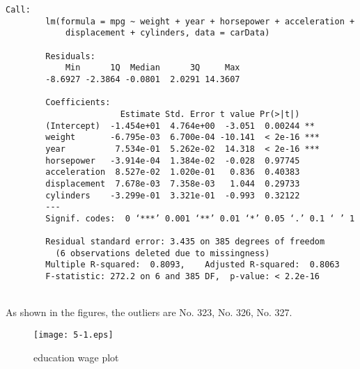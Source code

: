 \documentclass[12pt]{article}
\begin{document}
	\lstset{language=R}
	\lstset{frame=lines}
	\lstset{basicstyle=\footnotesize\ttfamily}
	\begin{lstlisting}[breaklines=true]
		Call:
		lm(formula = mpg ~ weight + year + horsepower + acceleration + 
		    displacement + cylinders, data = carData)
		
		Residuals:
		    Min      1Q  Median      3Q     Max 
		-8.6927 -2.3864 -0.0801  2.0291 14.3607 
		
		Coefficients:
					   Estimate Std. Error t value Pr(>|t|)    
		(Intercept)  -1.454e+01  4.764e+00  -3.051  0.00244 ** 
		weight       -6.795e-03  6.700e-04 -10.141  < 2e-16 ***
		year          7.534e-01  5.262e-02  14.318  < 2e-16 ***
		horsepower   -3.914e-04  1.384e-02  -0.028  0.97745    
		acceleration  8.527e-02  1.020e-01   0.836  0.40383    
		displacement  7.678e-03  7.358e-03   1.044  0.29733    
		cylinders    -3.299e-01  3.321e-01  -0.993  0.32122    
		---
		Signif. codes:  0 ‘***’ 0.001 ‘**’ 0.01 ‘*’ 0.05 ‘.’ 0.1 ‘ ’ 1
		
		Residual standard error: 3.435 on 385 degrees of freedom
		  (6 observations deleted due to missingness)
		Multiple R-squared:  0.8093,	Adjusted R-squared:  0.8063 
		F-statistic: 272.2 on 6 and 385 DF,  p-value: < 2.2e-16
	\end{lstlisting}
	\noindent
	\\
	As shown in the figures, the outliers are No. 323, No. 326, No. 327.\\
	\begin{figure}[htbp]
		\centering
		\texttt{[image: 5-1.eps]}
		\caption{education wage plot}
	\end{figure}
	
\end{document}
